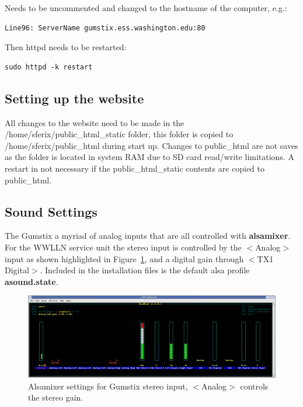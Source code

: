 Needs to be uncommented and changed to the hostname of the computer, e.g.:

\begin{verbatim}
Line96:	ServerName gumstix.ess.washington.edu:80
\end{verbatim}

Then httpd needs to be restarted:

\begin{verbatim}
sudo httpd -k restart
\end{verbatim}

\subsection*{Setting up the website}

All changes to the website need to be made in the /home/sferix/public\_html\_static folder, this folder is copied to /home/sferix/public\_html during start up. Changes to public\_html are not saves as the folder is located in system RAM due to SD card read/write limitations. A restart in not necessary if the public\_html\_static contents are copied to public\_html.

\subsection{Sound Settings}

The Gumstix a myriad of analog inputs that are all controlled with {\bf alsamixer}.
For the WWLLN service unit the stereo input is controlled by the $<$Analog$>$ input as shown highlighted in Figure~\ref{app:gumstix:fig:alsa}, and a digital gain through $<$TX1 Digital$>$.
Included in the installation files is the default alsa profile {\bf asound.state}.

\begin{figure}[ht!]
   \centering
   \includegraphics[scale=.3]{Appendix/Figures/gumstixmixer.png} 
   \caption{Alsamixer settings for Gumstix stereo input, $<$Analog$>$ controls the stereo gain.}
   \label{app:gumstix:fig:alsa}
\end{figure}

